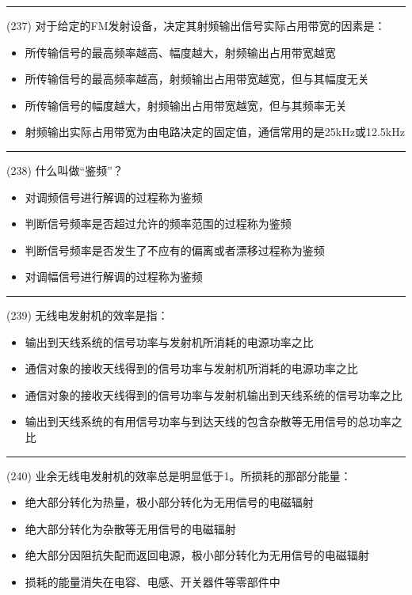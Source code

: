 \documentclass[twocolumn]{ctexart}  %
\begin{document}
\noindent\rule{0.5\textwidth}{1pt}
\heiti (237) 对于给定的FM发射设备，决定其射频输出信号实际占用带宽的因素是： \songti {\color{gray} [LK0786] }
\begin{itemize}
	\item  所传输信号的最高频率越高、幅度越大，射频输出占用带宽越宽
	\item  所传输信号的最高频率越高，射频输出占用带宽越宽，但与其幅度无关
	\item  所传输信号的幅度越大，射频输出占用带宽越宽，但与其频率无关
	\item  射频输出实际占用带宽为由电路决定的固定值，通信常用的是25kHz或12.5kHz
\end{itemize}


\noindent\rule{0.5\textwidth}{1pt}
\heiti (238) 什么叫做“鉴频”？ \songti {\color{gray} [LK0791] }
\begin{itemize}
	\item  对调频信号进行解调的过程称为鉴频
	\item  判断信号频率是否超过允许的频率范围的过程称为鉴频
	\item  判断信号频率是否发生了不应有的偏离或者漂移过程称为鉴频
	\item  对调幅信号进行解调的过程称为鉴频
\end{itemize}


\noindent\rule{0.5\textwidth}{1pt}
\heiti (239) 无线电发射机的效率是指： \songti {\color{gray} [LK0813] }
\begin{itemize}
	\item  输出到天线系统的信号功率与发射机所消耗的电源功率之比
	\item  通信对象的接收天线得到的信号功率与发射机所消耗的电源功率之比
	\item  通信对象的接收天线得到的信号功率与发射机输出到天线系统的信号功率之比
	\item  输出到天线系统的有用信号功率与到达天线的包含杂散等无用信号的总功率之比
\end{itemize}


\noindent\rule{0.5\textwidth}{1pt}
\heiti (240) 业余无线电发射机的效率总是明显低于1。所损耗的那部分能量： \songti {\color{gray} [LK0814] }
\begin{itemize}
	\item  绝大部分转化为热量，极小部分转化为无用信号的电磁辐射
	\item  绝大部分转化为杂散等无用信号的电磁辐射
	\item  绝大部分因阻抗失配而返回电源，极小部分转化为无用信号的电磁辐射
	\item  损耗的能量消失在电容、电感、开关器件等零部件中
\end{itemize}
\end{document}
